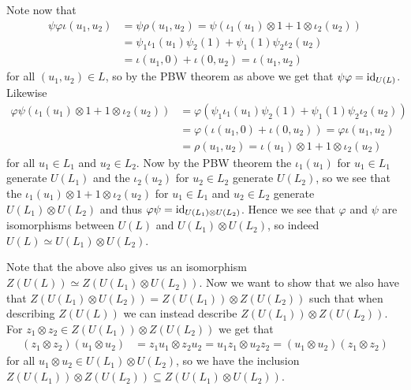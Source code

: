 Note now that
\begin{align*}
  \psi\varphi\iota(u_1,u_2) &= \psi\rho(u_1,u_2) = \psi(\iota_1(u_1)\otimes 1 + 1\otimes \iota_2(u_2)) \\
                              &= \psi_1\iota_1(u_1)\psi_2(1) + \psi_1(1)\psi_2\iota_2(u_2) \\
                            &= \iota(u_1,0) + \iota(0,u_2) = \iota(u_1,u_2)
\end{align*}
for all $(u_1,u_2)\in L$, so by the PBW theorem as above we get that $\psi\varphi=\operatorname{id}_{U(L)}$. Likewise
\begin{align*}
  \varphi\psi(\iota_1(u_1)\otimes 1 + 1\otimes \iota_2(u_2)) &= \varphi(\psi_1\iota_1(u_1)\psi_2(1) + \psi_1(1)\psi_2\iota_2(u_2)) \\
                                                             &= \varphi(\iota(u_1,0)+ \iota(0,u_2)) = \varphi\iota(u_1,u_2)\\
                                                             &= \rho(u_1,u_2) = \iota(u_1)\otimes 1 + 1\otimes \iota_2(u_2)
\end{align*}
for all $u_1\in L_1$ and $u_2\in L_2$. Now by the PBW theorem the $\iota_1(u_1)$ for $u_1\in L_1$ generate $U(L_1)$ and the $\iota_2(u_2)$ for $u_2\in L_2$ generate $U(L_2)$, so we see that the $\iota_1(u_1)\otimes 1+1\otimes\iota_2(u_2)$ for $u_1\in L_1$ and $u_2\in L_2$ generate $U(L_1)\otimes U(L_2)$ and thus $\varphi\psi=\operatorname{id}_{U(L_1)\otimes U(L_2)}$. Hence we see that $\varphi$ and $\psi$ are isomorphisms between $U(L)$ and $U(L_1)\otimes U(L_2)$, so indeed $U(L)\simeq U(L_1)\otimes U(L_2)$.

Note that the above also gives us an isomorphism $Z(U(L))\simeq Z(U(L_1)\otimes U(L_2))$. Now we want to show that we also have that $Z(U(L_1)\otimes U(L_2))= Z(U(L_1))\otimes Z(U(L_2))$ such that when describing $Z(U(L))$ we can instead describe $Z(U(L_1))\otimes Z(U(L_2))$. For $z_1\otimes z_2\in Z(U(L_1))\otimes Z(U(L_2))$ we get that
\begin{align*}
  (z_1\otimes z_2)(u_1\otimes u_2) &= z_1u_1\otimes z_2u_2 = u_1z_1\otimes u_2z_2 = (u_1\otimes u_2)(z_1\otimes z_2)
\end{align*}
for all $u_1\otimes u_2\in U(L_1)\otimes U(L_2)$, so we have the inclusion $Z(U(L_1))\otimes Z(U(L_2))\subseteq Z(U(L_1)\otimes U(L_2))$.

